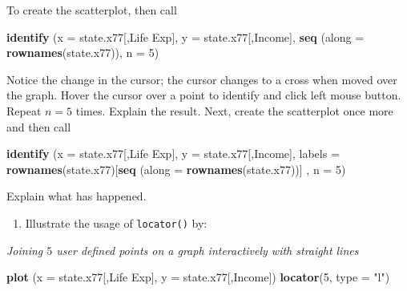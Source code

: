 \documentclass[
]{book}
\newenvironment{Shaded}{\begin{snugshade}}{\end{snugshade}}
\newcommand{\AttributeTok}[1]{\textcolor[rgb]{0.13,0.29,0.53}{#1}}
\newcommand{\DecValTok}[1]{\textcolor[rgb]{0.00,0.00,0.81}{#1}}
\newcommand{\FunctionTok}[1]{\textcolor[rgb]{0.13,0.29,0.53}{\textbf{#1}}}
\newcommand{\NormalTok}[1]{#1}
\newcommand{\StringTok}[1]{\textcolor[rgb]{0.31,0.60,0.02}{#1}}
\providecommand{\tightlist}{%
  \setlength{\itemsep}{0pt}\setlength{\parskip}{0pt}}
\begin{document}
To create the scatterplot, then call

\begin{Shaded}
\begin{Highlighting}[]
\FunctionTok{identify}\NormalTok{ (}\AttributeTok{x =}\NormalTok{ state.x77[,}\StringTok{\textquotesingle{}Life Exp\textquotesingle{}}\NormalTok{], }\AttributeTok{y =}\NormalTok{ state.x77[,}\StringTok{\textquotesingle{}Income\textquotesingle{}}\NormalTok{], }
          \FunctionTok{seq}\NormalTok{ (}\AttributeTok{along =} \FunctionTok{rownames}\NormalTok{(state.x77)), }\AttributeTok{n =} \DecValTok{5}\NormalTok{)}
\end{Highlighting}
\end{Shaded}

Notice the change in the cursor; the cursor changes to a cross when moved over the graph. Hover the cursor over a point to identify and click left mouse button. Repeat \(n = 5\) times. Explain the result. Next, create the scatterplot once more and then call

\begin{Shaded}
\begin{Highlighting}[]
\FunctionTok{identify}\NormalTok{ (}\AttributeTok{x =}\NormalTok{ state.x77[,}\StringTok{\textquotesingle{}Life Exp\textquotesingle{}}\NormalTok{],  }\AttributeTok{y =}\NormalTok{ state.x77[,}\StringTok{\textquotesingle{}Income\textquotesingle{}}\NormalTok{], }
          \AttributeTok{labels =} \FunctionTok{rownames}\NormalTok{(state.x77)[}\FunctionTok{seq}\NormalTok{ (}\AttributeTok{along =} 
                                              \FunctionTok{rownames}\NormalTok{(state.x77))] , }\AttributeTok{n =} \DecValTok{5}\NormalTok{) }
\end{Highlighting}
\end{Shaded}

Explain what has happened.

\begin{enumerate}
\def\labelenumi{(\alph{enumi})}
\setcounter{enumi}{2}
\tightlist
\item
  Illustrate the usage of \texttt{locator()} by:
\end{enumerate}

\emph{Joining \(5\) user defined points on a graph interactively with straight lines}

\begin{Shaded}
\begin{Highlighting}[]
\FunctionTok{plot}\NormalTok{ (}\AttributeTok{x =}\NormalTok{ state.x77[,}\StringTok{\textquotesingle{}Life Exp\textquotesingle{}}\NormalTok{], }\AttributeTok{y =}\NormalTok{ state.x77[,}\StringTok{\textquotesingle{}Income\textquotesingle{}}\NormalTok{])}
\FunctionTok{locator}\NormalTok{(}\DecValTok{5}\NormalTok{, }\AttributeTok{type =} \StringTok{"l"}\NormalTok{) }
\end{Highlighting}
\end{Shaded}
\end{document}
